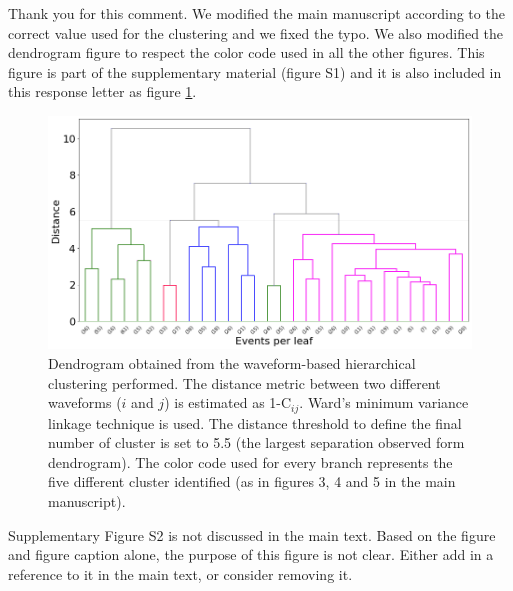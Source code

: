\documentclass[10pt]{extarticle}
\begin{document}
\begin{Answer}
Thank you for this comment. We modified the main manuscript according to the correct value used for the clustering and we fixed the typo. We also modified the dendrogram figure to respect the color code used in all the other figures. This figure is part of the supplementary material (figure S1) and it is also included in this response letter as figure \ref{fig:dendrogram}.
\begin{figure}[!h]
\begin{center}
 \includegraphics[width=1\linewidth]{dendrogram_balsorano.png} 
\end{center}
\caption{Dendrogram obtained from the waveform-based hierarchical clustering performed. The distance metric between two different waveforms ($i$ and $j$) is estimated as 1-C$_{ij}$. Ward's minimum variance linkage technique is used. The distance threshold to define the final number of cluster is set to 5.5 (the largest separation observed form dendrogram). The color code used for every branch represents the five different cluster identified (as in figures 3, 4 and 5 in the main manuscript).}
\label{fig:dendrogram}
\end{figure}
 \WorkInProgressRevTask
\end{Answer}
%
%



\begin{ReviewerComment}{2}
\noindent 
Supplementary Figure S2 is not discussed in the main text. Based on the figure and figure caption alone, the purpose of this figure is not clear. Either add in a reference to it in the main text, or consider removing it.

\end{ReviewerComment}


\begin{Answer}
 \WorkInProgressRevTask
\end{Answer}
%
%
\end{document}
